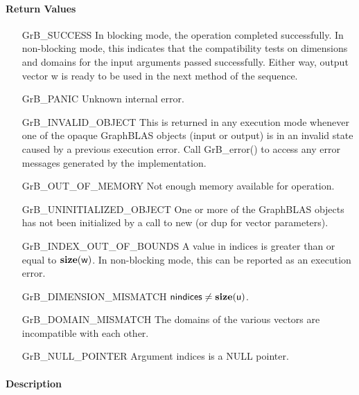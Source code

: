 \paragraph{Return Values}

\begin{itemize}[leftmargin=2.1in]
    \item[{\sf GrB\_SUCCESS}]         In blocking mode, the operation completed
    successfully. In non-blocking mode, this indicates that the compatibility 
    tests on dimensions and domains for the input arguments passed successfully. 
    Either way, output vector {\sf w} is ready to be used in the next method of 
    the sequence.

    \item[{\sf GrB\_PANIC}]            Unknown internal error.
    
    \item[{\sf GrB\_INVALID\_OBJECT}] This is returned in any execution mode 
    whenever one of the opaque GraphBLAS objects (input or output) is in an invalid 
    state caused by a previous execution error.  Call {\sf GrB\_error()} to access 
    any error messages generated by the implementation.

    \item[{\sf GrB\_OUT\_OF\_MEMORY}]  Not enough memory available for operation.
    
    \item[{\sf GrB\_UNINITIALIZED\_OBJECT}] One or more of the GraphBLAS objects
    has not been initialized by a call to {\sf new} (or {\sf dup} for vector
    parameters).

    \item[{\sf GrB\_INDEX\_OUT\_OF\_BOUNDS}]  A value in {\sf indices} is greater
    than or equal to $\bold{size}({\sf w})$.  In non-blocking mode, this can be
    reported as an execution error.
    
    \item[{\sf GrB\_DIMENSION\_MISMATCH}] ${\sf nindices} \neq \bold{size}({\sf u})$. 
    
    \item[{\sf GrB\_DOMAIN\_MISMATCH}]    The domains of the various vectors are
	incompatible with each other.

    \item[{\sf GrB\_NULL\_POINTER}] Argument {\sf indices} is a {\sf NULL} pointer.
\end{itemize}

\paragraph{Description}

